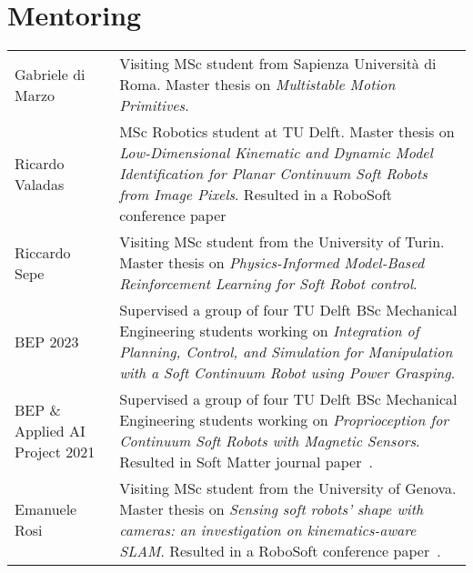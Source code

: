 \section*{Mentoring}
\noindent
\begin{longtable}{p{} p{}}
    Gabriele di Marzo & Visiting MSc student from Sapienza Università di Roma. Master thesis on \emph{Multistable Motion Primitives}.\\
    Ricardo Valadas & MSc Robotics student at TU Delft. Master thesis on \emph{Low-Dimensional Kinematic and Dynamic Model Identification for Planar Continuum Soft Robots from Image Pixels}. Resulted in a RoboSoft conference paper~\cite{valadas2025learning}\\
    Riccardo Sepe & Visiting MSc student from the University of Turin. Master thesis on \emph{Physics-Informed Model-Based Reinforcement Learning for Soft Robot control}.\\
    BEP 2023 & Supervised a group of four TU Delft BSc Mechanical Engineering students working on \emph{Integration of Planning, Control, and Simulation for Manipulation with a Soft Continuum Robot using Power Grasping}.\\
    BEP \& Applied AI Project 2021 & Supervised a group of four TU Delft BSc Mechanical Engineering students working on \emph{Proprioception for Continuum Soft Robots with Magnetic Sensors}. Resulted in Soft Matter journal paper~\cite{baaij2023learning}.\\
    Emanuele Rosi & Visiting MSc student from the University of Genova. Master thesis on \emph{Sensing soft robots' shape with cameras: an investigation on kinematics-aware SLAM}. Resulted in a RoboSoft conference paper~\cite{rosi2022sensing}.\\
\end{longtable}

